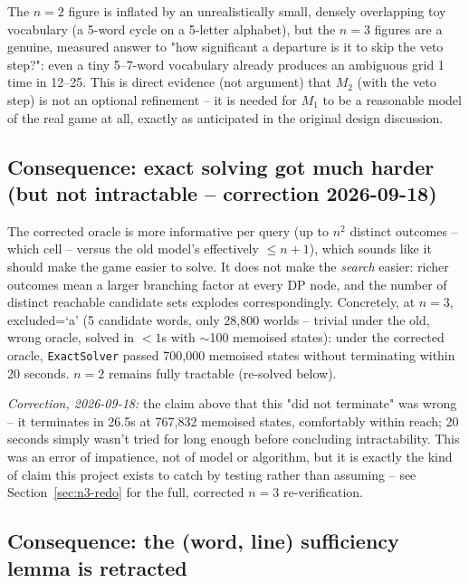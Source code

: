 \documentclass[11pt]{article}
\begin{document}
The $n=2$ figure is inflated by an unrealistically small, densely
overlapping toy vocabulary (a 5-word cycle on a 5-letter alphabet), but the
$n=3$ figures are a genuine, measured answer to "how significant a
departure is it to skip the veto step?": even a tiny 5--7-word vocabulary
already produces an ambiguous grid 1 time in 12--25. This is direct
evidence (not argument) that $M_2$ (with the veto step) is not an optional
refinement -- it is needed for $M_1$ to be a reasonable model of the real
game at all, exactly as anticipated in the original design discussion.

\subsection{Consequence: exact solving got much harder (but not
intractable -- correction 2026-09-18)}

The corrected oracle is more informative per query (up to $n^2$ distinct
outcomes -- which cell -- versus the old model's effectively $\le n+1$),
which sounds like it should make the game easier to solve. It does not
make the \emph{search} easier: richer outcomes mean a larger branching
factor at every DP node, and the number of distinct reachable candidate
sets explodes correspondingly. Concretely, at $n=3$, excluded=`a' (5
candidate words, only 28{,}800 worlds -- trivial under the old, wrong
oracle, solved in $<1$s with $\sim$100 memoised states): under the
corrected oracle, \texttt{ExactSolver} passed 700{,}000 memoised states
without terminating within 20 seconds. $n=2$ remains fully tractable
(re-solved below).

\emph{Correction, 2026-09-18:} the claim above that this "did not
terminate" was wrong -- it terminates in 26.5s at 767,832 memoised states,
comfortably within reach; 20 seconds simply wasn't tried for long enough
before concluding intractability. This was an error of impatience, not of
model or algorithm, but it is exactly the kind of claim this project
exists to catch by testing rather than assuming -- see
Section~\ref{sec:n3-redo} for the full, corrected $n=3$ re-verification.

\subsection{Consequence: the (word, line) sufficiency lemma is retracted}
\end{document}
